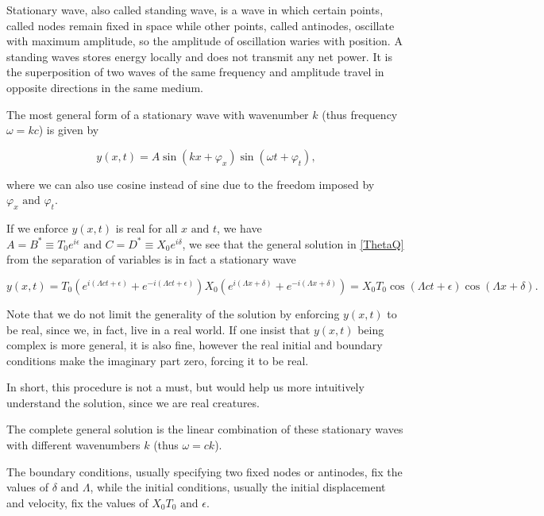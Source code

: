 \documentclass[a4paper,12pt]{report}
\begin{document}
Stationary wave, also called standing wave, is a wave in which certain points, called nodes remain fixed in space while other points, called antinodes, oscillate with maximum amplitude, so the amplitude of oscillation waries with position. A standing waves stores energy locally and does not transmit any net power. It is the superposition of two waves of the same frequency and amplitude travel in opposite directions in the same medium.

The most general form of a stationary wave with wavenumber \(k\) (thus frequency \(\omega = kc\)) is given by 

\begin{equation}
	y(x,t) = A \sin (kx + \varphi _{x} )\sin (\omega t+\varphi _{t} ),
\end{equation}

where we can also use cosine instead of sine due to the freedom imposed by \(\varphi _{x}\text { and } \varphi _{t}  \).   

If we enforce \(y(x,t)\) is real for all \(x \text { and } t\), we have \(A=B^* \equiv T_0 e^{i\epsilon } \text { and } C=D^* \equiv X_0 e^{i\delta } \), we see that the general solution in \cref{ThetaQ} from the separation of variables is in fact a stationary wave

\begin{equation}
	y(x,t) = T_0 (e^{i (\Lambda ct + \epsilon )}+e^{-i(\Lambda ct+\epsilon )}  ) X_0 (e^{i(\Lambda x+\delta )}+e^{-i(\Lambda x+\delta )} ) = X_0 T_0 \cos (\Lambda ct + \epsilon ) \cos (\Lambda x+\delta ).
\end{equation}

Note that we do not limit the generality of the solution by enforcing \(y(x,t)\) to be real, since we, in fact, live in a real world. If one insist that \(y(x,t)\) being complex is more general, it is also fine, however the real initial and boundary conditions make the imaginary part zero, forcing it to be real. 

In short, this procedure is not a must, but would help us more intuitively understand the solution, since we are real creatures.

The complete general solution is the linear combination of these stationary waves with different wavenumbers \(k\) (thus \(\omega = ck\)).

The boundary conditions, usually specifying two fixed nodes or antinodes, fix the values of \(\delta \text { and } \Lambda \), while the initial conditions, usually the initial displacement and velocity, fix the values of \(X_0 T_0 \text { and } \epsilon \).
\end{document}
